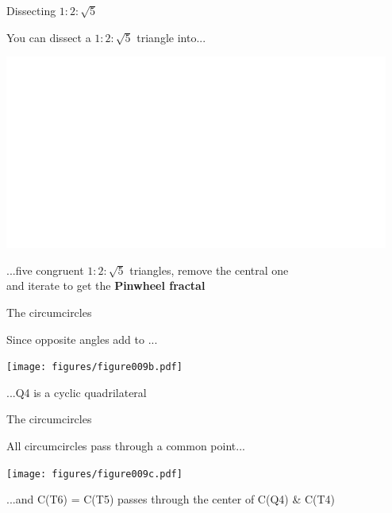 \documentclass[14pt]{beamer}
\begin{document}

    \begin{frame}{Dissecting $1\!\!:\!\!2\!\!:\!\!\sqrt{5}$}
        \begin{center}
            You can dissect a $1\!\!:\!\!2\!\!:\!\!\sqrt{5}$ triangle into...

            \bigskip \bigskip

            \includegraphics[height=18ex]{figures/figure006h.pdf}

            \bigskip \bigskip

            ...five congruent $1\!\!:\!\!2\!\!:\!\!\sqrt{5}$ triangles, remove the central one\\and iterate to get the \textbf{Pinwheel fractal}
        \end{center}
    \end{frame}


    \begin{frame}{The circumcircles}
        \begin{center}
            Since opposite angles add to \textpi...
        \end{center}
        \vspace{0.90em}
        \hspace{5.25em} \texttt{[image: figures/figure009b.pdf]} \\
        \begin{center}
            ...Q4 is a cyclic quadrilateral
        \end{center}
    \end{frame}


    \begin{frame}{The circumcircles}
        \begin{center}
            All circumcircles pass through a common point...
        \end{center}
        \hspace{3.92em} \texttt{[image: figures/figure009c.pdf]} \\
        \begin{center}
            \footnotesize ...and C(T6) = C(T5) passes through the center of C(Q4) \& C(T4)
        \end{center}
    \end{frame}
\end{document}
